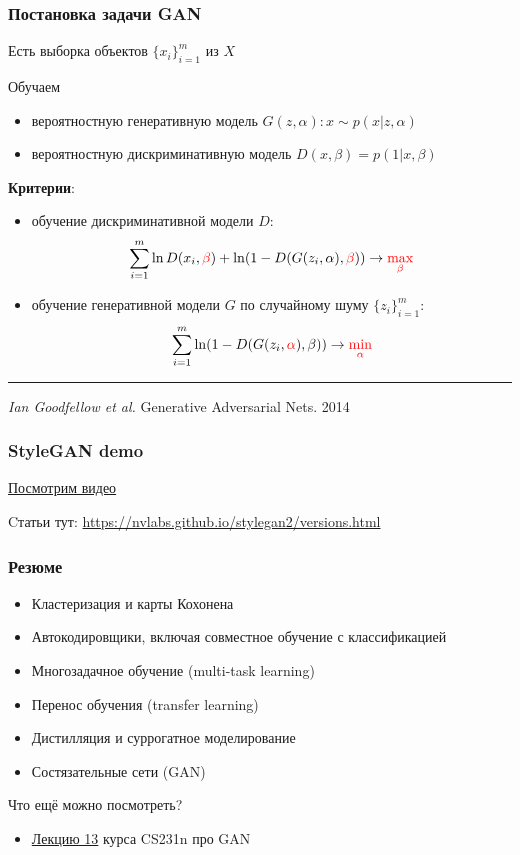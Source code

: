 \documentclass[fullscreen=true, bookmarks=true, hyperref={pdfencoding=unicode}]{beamer}
\begin{document}
\begin{frame}
  \frametitle{Постановка задачи GAN}

  Есть выборка объектов $\{x_i\}_{i=1}^m$ из $X$

  Обучаем

  \begin{itemize}
    \item вероятностную генеративную модель $G(z, \alpha): x \sim p(x|z,\alpha)$
    \item вероятностную дискриминативную модель $D(x, \beta) = p(1| x, \beta)$
  \end{itemize}

  {\bf Критерии}:
  \begin{itemize}
    \item обучение дискриминативной модели $D$:
      $$ \sum\limits_{i=1}^m \ln D(x_i, {\color{red}\beta}) + \ln(1 - D(G(z_i, \alpha), {\color{red}\beta})) \to {\color{red}\max\limits_{\beta}}$$
    \item обучение генеративной модели $G$ по случайному шуму $\{z_i\}_{i=1}^m$:
      $$ \sum\limits_{i=1}^m \ln(1 - D(G(z_i, {\color{red}\alpha}), \beta)) \to {\color{red}\min\limits_{\alpha}}$$
  \end{itemize}

  \noindent\rule{8cm}{0.4pt}

  {\small
  {\it Ian Goodfellow et al.} Generative Adversarial Nets. 2014}
\end{frame}


\begin{frame}
  \frametitle{StyleGAN demo}

  \href{https://www.youtube.com/watch?v=kSLJriaOumA}{Посмотрим видео}

  \vspace{2cm}
  Cтатьи тут: \href{https://nvlabs.github.io/stylegan2/versions.html}{https://nvlabs.github.io/stylegan2/versions.html}

\end{frame}

\begin{frame}
  \frametitle{Резюме}
  \begin{itemize}
    \item Кластеризация и карты Кохонена
    \item Автокодировщики, включая совместное обучение с классификацией
    \item Многозадачное обучение (multi-task learning)
    \item Перенос обучения (transfer learning)
    \item Дистилляция и суррогатное моделирование
    \item Состязательные сети (GAN)
  \end{itemize}
  \pause
  \vspace{1cm}
  Что ещё можно посмотреть?
  \begin{itemize}
    \item \href{https://www.youtube.com/watch?v=5WoItGTWV54}{Лекцию 13} курса CS231n про GAN
  \end{itemize}
\end{frame}
\end{document}
